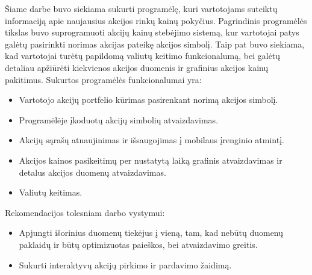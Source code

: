 Šiame darbe buvo siekiama sukurti programėlę, kuri vartotojams suteiktų informaciją apie naujausius akcijos rinkų kainų pokyčius. Pagrindinis programėlės tikslas buvo suprogramuoti akcijų kainų stebėjimo sistemą, kur vartotojai patys galėtų pasirinkti norimas akcijas pateikę akcijos simbolį. Taip pat buvo siekiama, kad vartotojai turėtų papildomą valiutų keitimo funkcionalumą, bei galėtų detaliau apžiūrėti kiekvienos akcijos duomenis ir grafinius akcijos kainų pakitimus. Sukurtos programėlės funkcionalumai yra:
\begin{itemize}
	\item Vartotojo akcijų portfelio kūrimas pasirenkant norimą akcijos simbolį.
	\item Programėlėje įkoduotų akcijų simbolių atvaizdavimas.
	\item Akcijų sąrašų atnaujinimas ir išsaugojimas į mobilaus įrenginio atmintį.
	\item Akcijos kainos pasikeitimų per nustatytą laiką grafinis atvaizdavimas ir detalus akcijos duomenų atvaizdavimas.
	\item Valiutų keitimas.
\end{itemize}
Rekomendacijos tolesniam darbo vystymui:
\begin{itemize}
	\item Apjungti išorinius duomenų tiekėjus į vieną, tam, kad nebūtų duomenų paklaidų ir būtų optimizuotas paieškos, bei atvaizdavimo greitis.
	\item Sukurti interaktyvų akcijų pirkimo ir pardavimo žaidimą.
\end{itemize}
